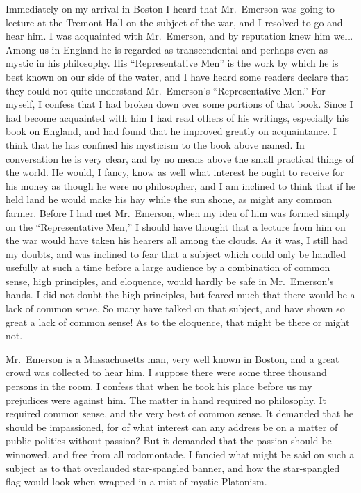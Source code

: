 Immediately on my arrival in Boston I heard that Mr.\ Emerson was
going to lecture at the Tremont Hall on the subject of the war, and
I resolved to go and hear him.  I was acquainted with Mr.\ Emerson,
and by reputation knew him well.  Among us in England he is
regarded as transcendental and perhaps even as mystic in his
philosophy.  His ``Representative Men'' is the work by which he is
best known on our side of the water, and I have heard some readers
declare that they could not quite understand Mr.\ Emerson's
``Representative Men.''  For myself, I confess that I had broken down
over some portions of that book.  Since I had become acquainted
with him I had read others of his writings, especially his book on
England, and had found that he improved greatly on acquaintance.  I
think that he has confined his mysticism to the book above named.
In conversation he is very clear, and by no means above the small
practical things of the world.  He would, I fancy, know as well
what interest he ought to receive for his money as though he were
no philosopher, and I am inclined to think that if he held land he
would make his hay while the sun shone, as might any common farmer.
Before I had met Mr.\ Emerson, when my idea of him was formed simply
on the ``Representative Men,'' I should have thought that a lecture
from him on the war would have taken his hearers all among the
clouds.  As it was, I still had my doubts, and was inclined to fear
that a subject which could only be handled usefully at such a time
before a large audience by a combination of common sense, high
principles, and eloquence, would hardly be safe in Mr.\ Emerson's
hands.  I did not doubt the high principles, but feared much that
there would be a lack of common sense.  So many have talked on that
subject, and have shown so great a lack of common sense!  As to the
eloquence, that might be there or might not.

Mr.\ Emerson is a Massachusetts man, very well known in Boston, and
a great crowd was collected to hear him.  I suppose there were some
three thousand persons in the room.  I confess that when he took
his place before us my prejudices were against him.  The matter in
hand required no philosophy.  It required common sense, and the
very best of common sense.  It demanded that he should be
impassioned, for of what interest can any address be on a matter of
public politics without passion?  But it demanded that the passion
should be winnowed, and free from all rodomontade.  I fancied what
might be said on such a subject as to that overlauded star-spangled
banner, and how the star-spangled flag would look when wrapped in a
mist of mystic Platonism.

